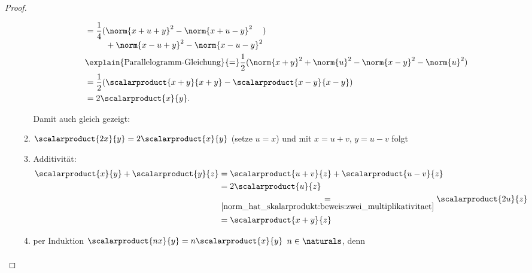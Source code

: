 \begin{proof}
\begin{proofdescription}
\begin{subproof}
\begin{proofdescription}
\begin{itemize}
\begin{enumerate}[label=\rechtsklammer{\arabic*}]
\begin{subproof}[denn:]
\begin{align*}
\begin{aligned}[t]
                                    &=\frac{1}{4}(\begin{aligned}[t]
                                        &\norm{x+u+y}^2-\norm{x+u-y}^2\\
                                        &+\norm{x-u+y}^2-\norm{x-u-y}^2
                                    \end{aligned}
                                    )\\
                                    &\explain{\text{Parallelogramm-Gleichung}}{=}\frac{1}{2}(\norm{x+y}^2+\norm{u}^2-\norm{x-y}^2-\norm{u}^2)\\
                                    &=\frac{1}{2}(\scalarproduct{x+y}{x+y}-\scalarproduct{x-y}{x-y})\\
                                    &=2\scalarproduct{x}{y}.
                                \end{aligned}
                            \end{align*}
                        \end{subproof}
                        Damit auch gleich gezeigt:
                        \item \label{norm_hat_skalarprodukt:beweis:zwei_multiplikativitaet}\( \scalarproduct{2x}{y}=2\scalarproduct{x}{y} \) (setze \( u=x \)) und mit \( x=u+v \), \( y=u-v \) folgt
                        \item \label{norm_hat_skalarprodukt:beweis:additivitaet}Additivität:
                        \begin{align*}
                            \scalarproduct{x}{y}+\scalarproduct{y}{z}\begin{aligned}[t]
                                &=\scalarproduct{u+v}{z}+\scalarproduct{u-v}{z}\\
                                &=2\scalarproduct{u}{z}\\
                                &\underset{\ref{norm_hat_skalarprodukt:beweis:zwei_multiplikativitaet}}{=}\scalarproduct{2u}{z}\\
                                &=\scalarproduct{x+y}{z}
                            \end{aligned}
                        \end{align*}
                        \item \label{norm_hat_skalarprodukt:beweis:natuerliche_multiplikativitaet}per Induktion \( \scalarproduct{nx}{y}=n\scalarproduct{x}{y} \) \tforall \( n\in \naturals \), denn
                        \begin{align*}

\end{align*}
\end{enumerate}
\end{itemize}
\end{proofdescription}
\end{subproof}
\end{proofdescription}
\end{proof}
